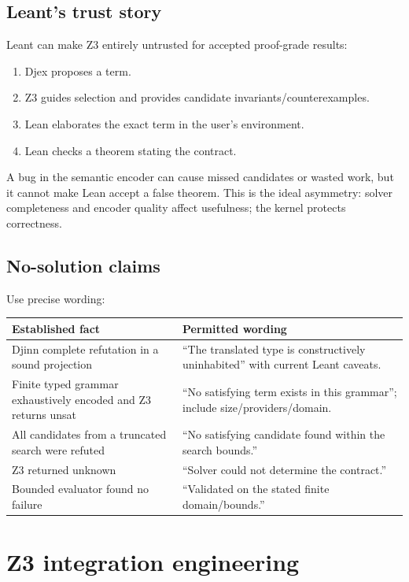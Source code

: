 \documentclass[11pt,oneside]{article}
\begin{document}
\subsection{Leant's trust story}

Leant can make Z3 entirely untrusted for accepted proof-grade results:

\begin{enumerate}
  \item Djex proposes a term.
  \item Z3 guides selection and provides candidate invariants/counterexamples.
  \item Lean elaborates the exact term in the user's environment.
  \item Lean checks a theorem stating the contract.
\end{enumerate}

A bug in the semantic encoder can cause missed candidates or wasted work, but it cannot
make Lean accept a false theorem. This is the ideal asymmetry: solver completeness and
encoder quality affect usefulness; the kernel protects correctness.

\subsection{No-solution claims}

Use precise wording:

\begin{longtable}{@{}p{}p{}@{}}
\toprule
\textbf{Established fact} & \textbf{Permitted wording} \\
\midrule
\endhead
Djinn complete refutation in a sound projection & ``The translated type is
constructively uninhabited'' with current Leant caveats. \\
Finite typed grammar exhaustively encoded and Z3 returns unsat & ``No satisfying term
exists in this grammar''; include size/providers/domain. \\
All candidates from a truncated search were refuted & ``No satisfying candidate found
within the search bounds.'' \\
Z3 returned unknown & ``Solver could not determine the contract.'' \\
Bounded evaluator found no failure & ``Validated on the stated finite domain/bounds.'' \\
\bottomrule
\end{longtable}

\section{Z3 integration engineering}
\end{document}
